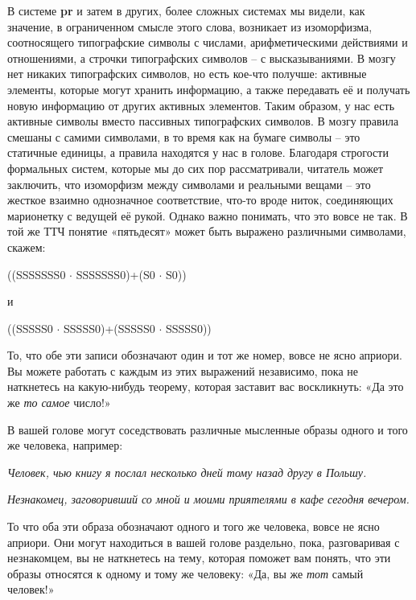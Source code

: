 \documentclass[../main.tex]{subfiles}
\begin{document}
В системе \textbf{pr} и затем в других, более сложных системах мы видели, как значение, в ограниченном смысле этого слова, возникает из изоморфизма, соотносящего типографские символы с числами, арифметическими действиями и отношениями, а строчки типографских символов \--- с высказываниями. В мозгу нет никаких типографских символов, но есть кое-что получше: активные элементы, которые могут хранить информацию, а также передавать её и получать новую информацию от других активных элементов. Таким образом, у нас есть активные символы вместо пассивных типографских символов. В мозгу правила смешаны с самими символами, в то время как на бумаге символы \--- это статичные единицы, а правила находятся у нас в голове. Благодаря строгости формальных систем, которые мы до сих пор рассматривали, читатель может заключить, что изоморфизм между символами и реальными вещами \--- это жесткое взаимно однозначное соответствие, что-то вроде ниток, соединяющих марионетку с ведущей её рукой. Однако важно понимать, что это вовсе не так. В той же ТТЧ понятие «пятьдесят» может быть выражено различными символами, скажем:

\begin{center}
    ((SSSSSSS{\large0} $\cdot$ SSSSSSS{\large0})+(S{\large0} $\cdot$ S{\large0}))

    и

    ((SSSSS{\large0} $\cdot$ SSSSS{\large0})+(SSSSS{\large0} $\cdot$ SSSSS{\large0}))
\end{center}


То, что обе эти записи обозначают один и тот же номер, вовсе не ясно априори. Вы можете работать с каждым из этих выражений независимо, пока не наткнетесь на какую-нибудь теорему, которая заставит вас воскликнуть: «Да это же \emph{то самое} число!»

В вашей голове могут соседствовать различные мысленные образы одного и того же человека, например:

\emph{Человек, чью книгу я послал несколько дней тому назад другу в Польшу.}

\emph{Незнакомец, заговоривший со мной и моими приятелями в кафе сегодня вечером.}

То что оба эти образа обозначают одного и того же человека, вовсе не ясно априори. Они могут находиться в вашей голове раздельно, пока, разговаривая с незнакомцем, вы не наткнетесь на тему, которая поможет вам понять, что эти образы относятся к одному и тому же человеку: «Да, вы же \emph{тот} самый человек!»
\end{document}
